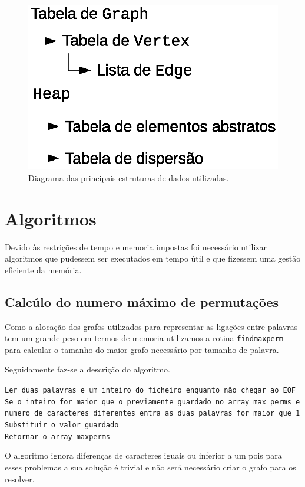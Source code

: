 \documentclass[portuguese, a4paper]{article}
\newcommand\tu[0]{\textunderscore}
\begin{document}
	\begin{figure}[H]
		\centering
		\includegraphics[width=0.4\linewidth]{data}
		\caption{Diagrama das principais estruturas de dados utilizadas.}
	\end{figure}


\section{Algoritmos}
\label{sec:alg}
	\par
	Devido às restrições de tempo e memoria impostas foi
	necessário utilizar algoritmos que pudessem ser executados em tempo útil e
	que fizessem uma gestão eficiente da memória.

	\subsection{Calcúlo do numero máximo de permutações}
	\par
	Como a alocação dos grafos utilizados para representar as ligações entre
	palavras tem um grande peso em termos de memoria utilizamos a rotina
	\texttt{find\tu max\tu perm} para calcular o tamanho do maior grafo
	necessário por tamanho de palavra.

	Seguidamente faz-se a descrição do algoritmo.\\
	\par

	\texttt{Ler duas palavras e um inteiro do ficheiro enquanto não chegar ao
	EOF} \\
	\indent\indent\texttt{Se o inteiro for maior que o previamente guardado no array max\tu
	perms e numero de caracteres diferentes entra as duas palavras for maior que
	1}\\
	\indent\indent\indent\texttt{Substituir o valor guardado}\\
	\indent\indent\indent\texttt{Retornar o array max\tu perms}\\

	\par
	O algoritmo ignora diferenças de caracteres iguais ou inferior a um pois
	para esses problemas a sua solução é trivial e não será necessário criar o
	grafo para os resolver.
\end{document}

